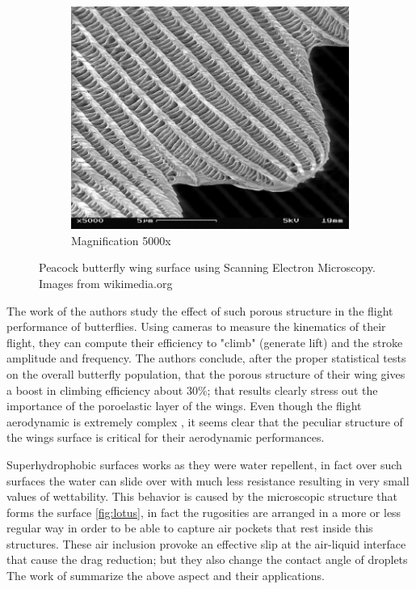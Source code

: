 \begin{figure}[h]
\begin{subfigure}[b]{0.3\textwidth}
	\end{subfigure}
	\begin{subfigure}[b]{0.3\textwidth}
		\includegraphics[width=\textwidth]{chapter_1/butterfly3}
		\caption{Magnification 5000x}
		\label{fig:b5000}
	\end{subfigure}
	\caption{Peacock butterfly wing surface using Scanning Electron Microscopy.  Images from wikimedia.org}
	\label{fig:butterfly}
\end{figure}

The work of \citet{slegers2017beneficial} the authors study the effect of such porous structure in the flight performance of butterflies.
Using cameras to measure the kinematics of their flight, they can compute their efficiency to "climb" (generate lift) and the stroke amplitude and frequency.
The authors conclude, after the proper statistical tests on the overall butterfly population, that the porous structure of their wing gives a boost in climbing efficiency about $30\%$; that results clearly stress out the importance of the poroelastic layer of the wings. 
Even though the flight aerodynamic is extremely complex \cite{srygley2002unconventional}, it seems clear that the peculiar structure of the wings surface is critical for their aerodynamic performances.


Superhydrophobic surfaces works as they were water repellent, in fact over such surfaces the water can slide over with much less resistance resulting in very small values of wettability.
This behavior is caused by the microscopic structure that forms the surface \ref{fig:lotus}, in fact the rugosities are arranged in a more or less regular way in order to be able to capture air pockets that rest inside this structures.
These air inclusion provoke an effective slip at the air-liquid interface that cause the drag reduction; but they also change the contact angle of droplets 
The work of \citet{bottaro2003effect} summarize the above aspect and their applications.

